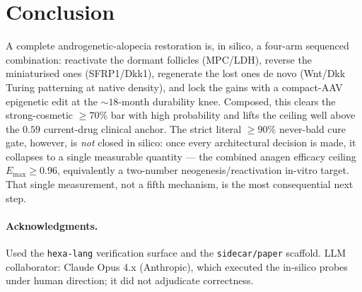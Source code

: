 \documentclass[11pt,a4paper]{article}
\begin{document}
\section{Conclusion}
\label{sec:conclusion}
A complete androgenetic-alopecia restoration is, in silico, a four-arm sequenced
combination: reactivate the dormant follicles (MPC/LDH), reverse the miniaturised ones
(SFRP1/Dkk1), regenerate the lost ones de novo (Wnt/Dkk Turing patterning at native
density), and lock the gains with a compact-AAV epigenetic edit at the $\sim\!18$-month
durability knee. Composed, this clears the strong-cosmetic $\geq\!70\%$ bar with high
probability and lifts the ceiling well above the $0.59$ current-drug clinical anchor. The
strict literal $\geq\!90\%$ never-bald cure gate, however, is \emph{not} closed in silico:
once every architectural decision is made, it collapses to a single measurable quantity ---
the combined anagen efficacy ceiling $E_{\max}\geq 0.96$, equivalently a two-number
neogenesis/reactivation in-vitro target. That single measurement, not a fifth mechanism, is
the most consequential next step.

\paragraph{Acknowledgments.}
Used the \texttt{hexa-lang} verification surface and the \texttt{sidecar/paper} scaffold.
LLM collaborator: Claude Opus 4.x (Anthropic), which executed the in-silico probes under
human direction; it did not adjudicate correctness.

\appendix
\end{document}
